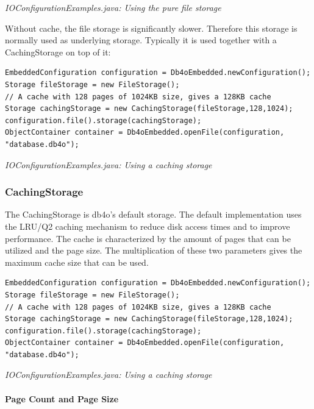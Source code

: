 {\small\itshape IOConfigurationExamples.java: Using the pure file storage\par}
\medskip

Without cache, the file storage is significantly slower. Therefore this storage is normally used as underlying storage. Typically it is used together with a CachingStorage on top of it:

\begin{lstlisting}
EmbeddedConfiguration configuration = Db4oEmbedded.newConfiguration();
Storage fileStorage = new FileStorage();
// A cache with 128 pages of 1024KB size, gives a 128KB cache
Storage cachingStorage = new CachingStorage(fileStorage,128,1024);
configuration.file().storage(cachingStorage);
ObjectContainer container = Db4oEmbedded.openFile(configuration, "database.db4o");
\end{lstlisting}

{\small\itshape IOConfigurationExamples.java: Using a caching storage\par}
\medskip

\subsubsection{CachingStorage}
\label{ref:configuration-file-storage-cachingstorage}

The CachingStorage is db4o's default storage. The default implementation uses the LRU/Q2 caching mechanism to reduce disk access times and to improve performance. The cache is characterized by the amount of pages that can be utilized and the page size. The multiplication of these two parameters gives the maximum cache size that can be used.

\begin{lstlisting}
EmbeddedConfiguration configuration = Db4oEmbedded.newConfiguration();
Storage fileStorage = new FileStorage();
// A cache with 128 pages of 1024KB size, gives a 128KB cache
Storage cachingStorage = new CachingStorage(fileStorage,128,1024);
configuration.file().storage(cachingStorage);
ObjectContainer container = Db4oEmbedded.openFile(configuration, "database.db4o");
\end{lstlisting}

{\small\itshape IOConfigurationExamples.java: Using a caching storage\par}
\medskip

\paragraph*{Page Count and Page Size}

